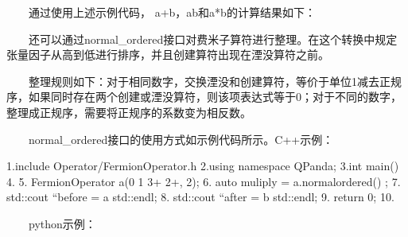 \documentclass[a4paper,11pt,english]{sphinxmanual}
\begin{document}
\sphinxAtStartPar
  通过使用上述示例代码， a+b，a\sphinxhyphen{}b和a*b的计算结果如下：

\begin{sphinxVerbatim}[commandchars=\\\{\}]
    
   
   
    
   
    
    
     
\end{sphinxVerbatim}

\sphinxAtStartPar
  还可以通过normal\_ordered接口对费米子算符进行整理。在这个转换中规定张量因子从高到低进行排序，并且创建算符出现在湮没算符之前。

\sphinxAtStartPar
  整理规则如下：对于相同数字，交换湮没和创建算符，等价于单位1减去正规序，如果同时存在两个创建或湮没算符，则该项表达式等于0；对于不同的数字，整理成正规序，需要将正规序的系数变为相反数。

\sphinxAtStartPar
  normal\_ordered接口的使用方式如示例代码所示。C++示例：

\begin{sphinxVerbatim}[commandchars=\\\{\}]
1.\PYGZsh{}include \PYGZdq{}Operator/FermionOperator.h\PYGZdq{}
2.using namespace QPanda;
3.int main()
4.\PYGZob{}
5.    FermionOperator a(\PYGZdq{}0 1 3+ 2+\PYGZdq{}, 2);
6.    auto muliply = a.normal\PYGZus{}ordered() ;
7.    std::cout \PYGZlt{}\PYGZlt{} “before = \PYGZdq{} \PYGZlt{}\PYGZlt{} a \PYGZlt{}\PYGZlt{} std::endl;
8.    std::cout \PYGZlt{}\PYGZlt{} “after = \PYGZdq{} \PYGZlt{}\PYGZlt{} b \PYGZlt{}\PYGZlt{} std::endl;
9.    return 0;
10.\PYGZcb{}
\end{sphinxVerbatim}

\sphinxAtStartPar
  python示例：
\end{document}
